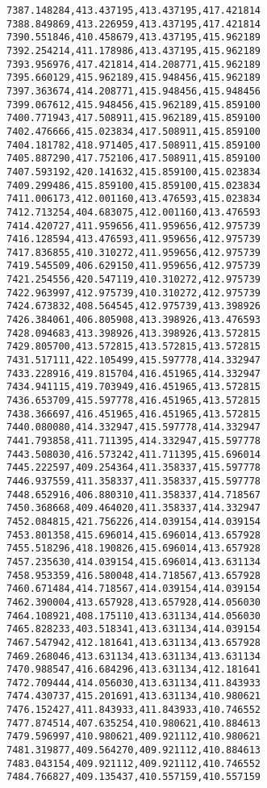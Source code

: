 \documentclass[11pt]{article}
\begin{document}
\begin{Verbatim}[commandchars=\\\{\}]
7387.148284,413.437195,413.437195,417.421814
7388.849869,413.226959,413.437195,417.421814
7390.551846,410.458679,413.437195,415.962189
7392.254214,411.178986,413.437195,415.962189
7393.956976,417.421814,414.208771,415.962189
7395.660129,415.962189,415.948456,415.962189
7397.363674,414.208771,415.948456,415.948456
7399.067612,415.948456,415.962189,415.859100
7400.771943,417.508911,415.962189,415.859100
7402.476666,415.023834,417.508911,415.859100
7404.181782,418.971405,417.508911,415.859100
7405.887290,417.752106,417.508911,415.859100
7407.593192,420.141632,415.859100,415.023834
7409.299486,415.859100,415.859100,415.023834
7411.006173,412.001160,413.476593,415.023834
7412.713254,404.683075,412.001160,413.476593
7414.420727,411.959656,411.959656,412.975739
7416.128594,413.476593,411.959656,412.975739
7417.836855,410.310272,411.959656,412.975739
7419.545509,406.629150,411.959656,412.975739
7421.254556,420.547119,410.310272,412.975739
7422.963997,412.975739,410.310272,412.975739
7424.673832,408.564545,412.975739,413.398926
7426.384061,406.805908,413.398926,413.476593
7428.094683,413.398926,413.398926,413.572815
7429.805700,413.572815,413.572815,413.572815
7431.517111,422.105499,415.597778,414.332947
7433.228916,419.815704,416.451965,414.332947
7434.941115,419.703949,416.451965,413.572815
7436.653709,415.597778,416.451965,413.572815
7438.366697,416.451965,416.451965,413.572815
7440.080080,414.332947,415.597778,414.332947
7441.793858,411.711395,414.332947,415.597778
7443.508030,416.573242,411.711395,415.696014
7445.222597,409.254364,411.358337,415.597778
7446.937559,411.358337,411.358337,415.597778
7448.652916,406.880310,411.358337,414.718567
7450.368668,409.464020,411.358337,414.332947
7452.084815,421.756226,414.039154,414.039154
7453.801358,415.696014,415.696014,413.657928
7455.518296,418.190826,415.696014,413.657928
7457.235630,414.039154,415.696014,413.631134
7458.953359,416.580048,414.718567,413.657928
7460.671484,414.718567,414.039154,414.039154
7462.390004,413.657928,413.657928,414.056030
7464.108921,408.175110,413.631134,414.056030
7465.828233,403.518341,413.631134,414.039154
7467.547942,412.181641,413.631134,413.657928
7469.268046,413.631134,413.631134,413.631134
7470.988547,416.684296,413.631134,412.181641
7472.709444,414.056030,413.631134,411.843933
7474.430737,415.201691,413.631134,410.980621
7476.152427,411.843933,411.843933,410.746552
7477.874514,407.635254,410.980621,410.884613
7479.596997,410.980621,409.921112,410.980621
7481.319877,409.564270,409.921112,410.884613
7483.043154,409.921112,409.921112,410.746552
7484.766827,409.135437,410.557159,410.557159

\end{Verbatim}
\end{document}
